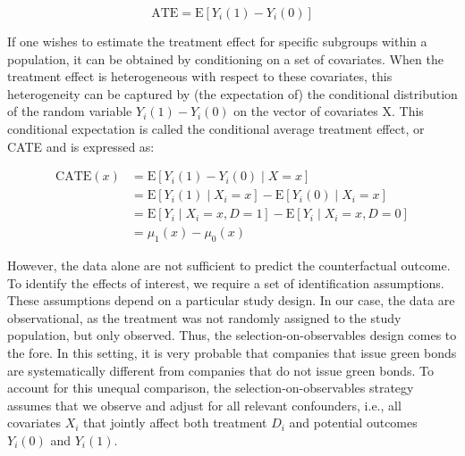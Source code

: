 \begin{equation}
    \text{ATE} = \mathrm{E}[Y_{i}(1)-Y_{i}(0)]
\end{equation}

If one wishes to estimate the treatment effect for specific subgroups within a population, it can be obtained by conditioning on a set of covariates. When the treatment effect is heterogeneous with respect to these covariates, this heterogeneity can be captured by (the expectation of) the conditional distribution of the random variable $Y_{i}(1) - Y_{i}(0)$ on the vector of covariates X. This conditional expectation is called the conditional average treatment effect, or CATE and is expressed as:

\begin{align}
    \text{CATE}(x) &= \mathrm{E}[Y_{i}(1)-Y_{i}(0) \mid X=x] \\
    &= \mathrm{E}[Y_{i}(1) \mid X_{i}=x]-\mathrm{E}[Y_{i}(0) \mid X_{i}=x] \nonumber \\
    &= \mathrm{E}[Y_{i} \mid X_{i}=x, D=1]-\mathrm{E}[Y_{i} \mid X_{i}=x, D=0] \nonumber \\
    &= \mu_1(x)-\mu_0(x) \nonumber
\end{align}

However, the data alone are not sufficient to predict the counterfactual outcome. To identify the effects of interest, we require a set of identification assumptions. These assumptions depend on a particular study design. In our case, the data are observational, as the treatment was not randomly assigned to the study population, but only observed. Thus, the selection-on-observables design comes to the fore. In this setting, it is very probable that companies that issue green bonds are systematically different from companies that do not issue green bonds. To account for this unequal comparison, the selection-on-observables strategy assumes that we observe and adjust for all relevant confounders, i.e., all covariates $X_i$ that jointly affect both treatment $D_i$ and potential outcomes $Y_{i}(0)$ and $Y_{i}(1)$.

